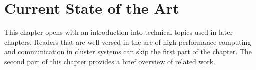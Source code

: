 \chapter{Current State of the Art}
\label{sec:state}







This chapter opens with an introduction into technical topics used in
later chapters. Readers that are well versed in the are of high
performance computing and communication in cluster systems can skip
the first part of the chapter. The second part of this chapter
provides a brief overview of related work.


